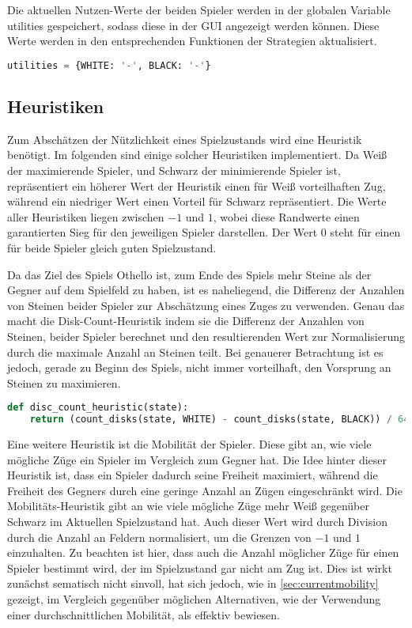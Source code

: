 Die aktuellen Nutzen-Werte der beiden Spieler werden in der globalen
Variable utilities gespeichert, sodass diese in der GUI angezeigt werden
können. Diese Werte werden in den entsprechenden Funktionen der
Strategien aktualisiert.

\begin{lstlisting}[language=Python]
utilities = {WHITE: '-', BLACK: '-'}
\end{lstlisting}

\hypertarget{heuristiken}{%
\subsection{Heuristiken}\label{heuristiken}}

Zum Abschätzen der Nützlichkeit eines Spielzustands wird eine Heuristik
benötigt. Im folgenden sind einige solcher Heuristiken implementiert. Da
Weiß der maximierende Spieler, und Schwarz der minimierende Spieler ist,
repräsentiert ein höherer Wert der Heuristik einen für Weiß
vorteilhaften Zug, während ein niedriger Wert einen Vorteil für Schwarz
repräsentiert. Die Werte aller Heuristiken liegen zwischen \(-1\) und
\(1\), wobei diese Randwerte einen garantierten Sieg für den jeweiligen
Spieler darstellen. Der Wert \(0\) steht für einen für beide Spieler
gleich guten Spielzustand.

Da das Ziel des Spiels Othello ist, zum Ende des Spiels mehr Steine als
der Gegner auf dem Spielfeld zu haben, ist es naheliegend, die Differenz
der Anzahlen von Steinen beider Spieler zur Abschätzung eines Zuges zu
verwenden. Genau das macht die Disk-Count-Heuristik indem sie die
Differenz der Anzahlen von Steinen, beider Spieler berechnet und den
resultierenden Wert zur Normalisierung durch die maximale Anzahl an
Steinen teilt. Bei genauerer Betrachtung ist es jedoch, gerade zu Beginn
des Spiels, nicht immer vorteilhaft, den Vorsprung an Steinen zu
maximieren.

\begin{lstlisting}[language=Python]
def disc_count_heuristic(state):
    return (count_disks(state, WHITE) - count_disks(state, BLACK)) / 64
\end{lstlisting}

Eine weitere Heuristik ist die Mobilität der Spieler. Diese gibt an, wie
viele mögliche Züge ein Spieler im Vergleich zum Gegner hat. Die Idee
hinter dieser Heuristik ist, dass ein Spieler dadurch seine Freiheit
maximiert, während die Freiheit des Gegners durch eine geringe Anzahl an
Zügen eingeschränkt wird. Die Mobilitäts-Heuristik gibt an wie viele
mögliche Züge mehr Weiß gegenüber Schwarz im Aktuellen Spielzustand hat.
Auch dieser Wert wird durch Division durch die Anzahl an Feldern
normalisiert, um die Grenzen von \(-1\) und \(1\) einzuhalten. Zu
beachten ist hier, dass auch die Anzahl möglicher Züge für einen Spieler
bestimmt wird, der im Spielzustand gar nicht am Zug ist. Dies ist wirkt
zunächst sematisch nicht sinvoll, hat sich jedoch, wie in
\autoref{sec:currentmobility} gezeigt, im Vergleich gegenüber möglichen
Alternativen, wie der Verwendung einer durchschnittlichen Mobilität, als
effektiv bewiesen.

